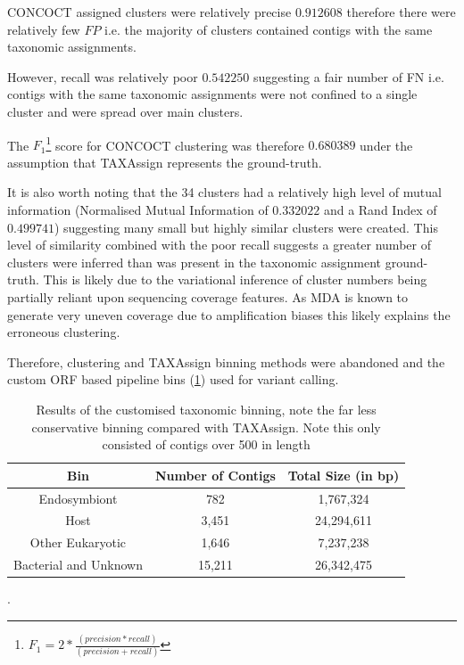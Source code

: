 CONCOCT assigned clusters were relatively precise \(0.912608\) 
therefore there were relatively few \(FP\) i.e. the majority of clusters 
contained contigs with the same taxonomic assignments. 

However, recall was relatively poor \(0.542250\) suggesting a
fair number of FN i.e. contigs with the same taxonomic assignments
were not confined to a single cluster and were spread over main clusters.

The \(F_1\)\footnote{\(F_1 = 2 * \frac{(precision * recall)}{(precision + recall)}\)} score for CONCOCT 
clustering was therefore \(0.680389\) under the assumption that 
TAXAssign represents the ground-truth. 

It is also worth noting that the 34 clusters had a relatively high level of mutual information
(Normalised Mutual Information of \(0.332022\) and a Rand Index of \(0.499741\)) suggesting
many small but highly similar clusters were created.  This level of similarity combined
with the poor recall suggests a greater number of clusters were inferred than was
present in the taxonomic assignment ground-truth.  This is likely due to
the variational inference of cluster numbers being partially reliant upon
sequencing coverage features.  As MDA is known to generate very uneven coverage 
due to amplification biases this likely explains the erroneous clustering.


Therefore, clustering and TAXAssign binning methods were abandoned and
the custom ORF based pipeline bins (\cref{tab:custom_tax_bin}) used
for variant calling.

\begin{table}
    \centering
    \begin{tabular}{|c|c|c|}
        \hline
        \textbf{Bin} & \textbf{Number of Contigs} & \textbf{Total Size (in \si{bp})} \\
        \hline
        Endosymbiont & 782 & 1,767,324\\
        Host & 3,451 &  24,294,611 \\
        \hline
        Other Eukaryotic & 1,646 & 7,237,238\\
        Bacterial and Unknown & 15,211 & 26,342,475 \\
        \hline
    \end{tabular}
    \caption[Custom taxonomic binning results]{Results of the customised taxonomic binning,
    note the far less conservative binning compared with TAXAssign. Note this only
    consisted of contigs over \SI{500}{\bp} in length}.
\label{tab:custom_tax_bin}
\end{table}

